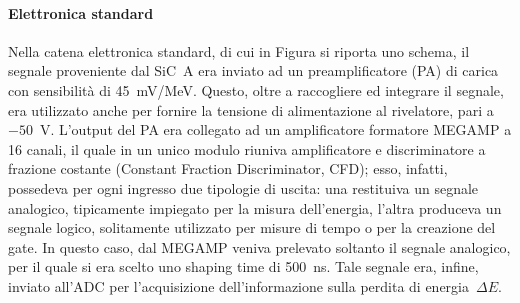 


\paragraph{Elettronica standard} 
Nella catena elettronica standard, di cui in Figura si riporta uno schema, il segnale proveniente dal SiC~A era inviato ad un preamplificatore (PA) di carica~\cite{boiano:ieee08} con sensibilità di 45~mV/MeV.
Questo, oltre a raccogliere ed integrare il segnale, era utilizzato anche per fornire la tensione di alimentazione al rivelatore, pari a $-50$~V.
L'output del PA era collegato ad un amplificatore formatore MEGAMP a 16 canali, il quale in un unico modulo riuniva amplificatore e discriminatore a frazione costante (Constant Fraction Discriminator, CFD); esso, infatti, possedeva per ogni ingresso due tipologie di uscita: una restituiva un segnale analogico, tipicamente impiegato per la misura dell'energia, l'altra produceva un segnale logico, solitamente utilizzato per misure di tempo o per la creazione del gate.
%
%
In questo caso, dal MEGAMP veniva prelevato soltanto il segnale analogico, per il quale si era scelto uno shaping time di 500~ns.
Tale segnale era, infine, inviato all'ADC per l'acquisizione dell'informazione sulla perdita di energia~$\Delta E$.
%

